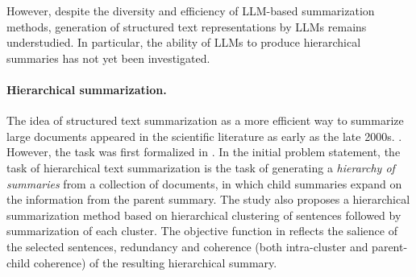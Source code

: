 \documentclass[11pt,a4paper]{article}
\begin{document}


However, despite the diversity and efficiency of LLM-based summarization methods, generation of structured text representations by LLMs remains understudied. In particular, the ability of LLMs to produce hierarchical summaries has not yet been investigated.


\paragraph{Hierarchical summarization.} The idea of structured text summarization as a more efficient way to summarize large documents appeared in the scientific literature as early as the late 2000s. \cite{yang2008hierarchical}. However, the task was first formalized in \cite{christensen2014hierarchical}. In the initial problem statement, the task of hierarchical text summarization is the task of generating a \textit{hierarchy of summaries} from a collection of documents, in which child summaries expand on the information from the parent summary. The study \cite{christensen2014hierarchical} also proposes a hierarchical summarization method based on hierarchical clustering of sentences followed by summarization of each cluster. The objective function in \cite{christensen2014hierarchical} reflects the salience of the selected sentences, redundancy and coherence (both intra-cluster and parent-child coherence) of the resulting hierarchical summary. 
\end{document}
